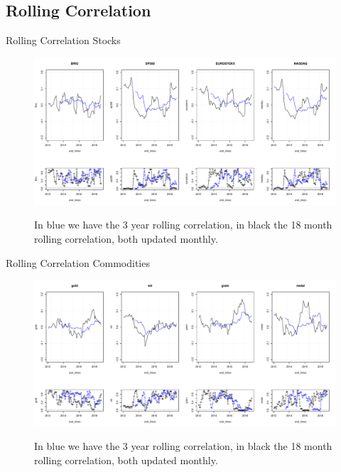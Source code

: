 \documentclass{beamer}
\begin{document}
\subsection{Rolling Correlation}

\begin{frame}{Rolling Correlation Stocks}
\begin{figure}
\includegraphics[width=\textwidth]{rolling_stocks.pdf}
\label{roll_stocks}
\caption{In blue we have the 3 year rolling correlation, in black the 18 month rolling correlation, both updated monthly.}
\end{figure}
\end{frame}

\begin{frame}{Rolling Correlation Commodities}
\begin{figure}
\includegraphics[width=\textwidth]{rolling_commodities.pdf}
\label{roll_comm}
\caption{In blue we have the 3 year rolling correlation, in black the 18 month rolling correlation, both updated monthly.}
\end{figure}
\end{frame}
\end{document}
